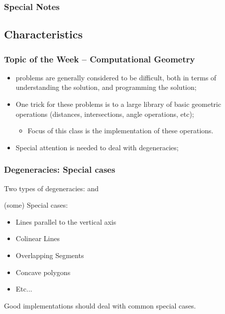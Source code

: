 \documentclass{beamer}
\begin{document}
\begin{frame}
  \frametitle{Special Notes}

\end{frame}

\subsection{Characteristics}
\begin{frame}
  \frametitle{Topic of the Week -- Computational Geometry}
  {\small
  
    \begin{itemize}
    \item {} problems are generally
      considered to be difficult, both in terms of understanding the
      solution, and programming the solution;

      \vfill

    \item One trick for these problems is to  a
      large library of basic geometric operations (distances,
      intersections, angle operations, etc); \\

      \begin{itemize}
        \item {\smaller Focus of this class is the implementation of these
          operations.}
      \end{itemize}

      \vfill

    \item Special attention is needed to deal with \alert{degeneracies};
    \end{itemize}
  }
\end{frame}

\begin{frame}
  \frametitle{Degeneracies: Special cases}

  {\smaller
    \begin{block}{}
      Two types of degeneracies:  and
    \end{block}

    \bigskip

    (some) Special cases:
    \begin{itemize}
    \item Lines parallel to the vertical axis
    \item Colinear Lines
    \item Overlapping Segments
    \item Concave polygons
    \item Etc...
    \end{itemize}

    \medskip

    Good implementations should deal with common special cases.
  }
\end{frame}
\end{document}

